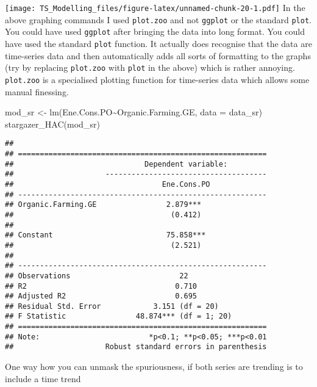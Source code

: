 \documentclass[
]{article}
\newenvironment{Shaded}{\begin{snugshade}}{\end{snugshade}}
\newcommand{\AttributeTok}[1]{\textcolor[rgb]{0.77,0.63,0.00}{#1}}
\newcommand{\FunctionTok}[1]{\textcolor[rgb]{0.00,0.00,0.00}{#1}}
\newcommand{\NormalTok}[1]{#1}
\newcommand{\OtherTok}[1]{\textcolor[rgb]{0.56,0.35,0.01}{#1}}
\newcommand{\SpecialCharTok}[1]{\textcolor[rgb]{0.00,0.00,0.00}{#1}}
\begin{document}
\texttt{[image: TS\_Modelling\_files/figure-latex/unnamed-chunk-20-1.pdf]}
In the above graphing commands I used \texttt{plot.zoo} and not
\texttt{ggplot} or the standard \texttt{plot}. You could have used
\texttt{ggplot} after bringing the data into long format. You could have
used the standard \texttt{plot} function. It actually does recognise
that the data are time-series data and then automatically adds all sorts
of formatting to the graphs (try by replacing \texttt{plot.zoo} with
\texttt{plot} in the above) which is rather annoying. \texttt{plot.zoo}
is a specialised plotting function for time-series data which allows
some manual finessing.

\begin{Shaded}
\begin{Highlighting}[]
\NormalTok{mod\_sr }\OtherTok{\textless{}{-}} \FunctionTok{lm}\NormalTok{(Ene.Cons.PO}\SpecialCharTok{\textasciitilde{}}\NormalTok{Organic.Farming.GE, }\AttributeTok{data =}\NormalTok{ data\_sr)}
\FunctionTok{stargazer\_HAC}\NormalTok{(mod\_sr)}
\end{Highlighting}
\end{Shaded}

\begin{verbatim}
## 
## =========================================================
##                              Dependent variable:         
##                     -------------------------------------
##                                  Ene.Cons.PO             
## ---------------------------------------------------------
## Organic.Farming.GE                2.879***               
##                                    (0.412)               
##                                                          
## Constant                          75.858***              
##                                    (2.521)               
##                                                          
## ---------------------------------------------------------
## Observations                         22                  
## R2                                  0.710                
## Adjusted R2                         0.695                
## Residual Std. Error            3.151 (df = 20)           
## F Statistic                48.874*** (df = 1; 20)        
## =========================================================
## Note:                         *p<0.1; **p<0.05; ***p<0.01
##                     Robust standard errors in parenthesis
\end{verbatim}

One way how you can unmask the spuriousness, if both series are trending
is to include a time trend
\end{document}
